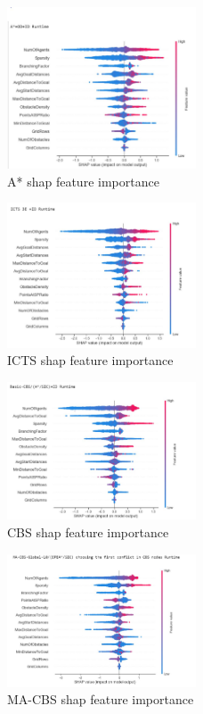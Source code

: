 \documentclass[letterpaper]{article} %
\begin{document}
\begin{figure}[h]
    \centering
    \includegraphics[width=0.5\textwidth]{ASTAR.JPG}
    \caption{A* shap feature importance}
    \label{fig:3}
\end{figure}
\begin{figure}[h]
    \centering
    \includegraphics[width=0.5\textwidth]{ICTS.JPG}
    \caption{ICTS shap feature importance}
    \label{fig:3}
\end{figure}
\begin{figure}[h]
    \centering
    \includegraphics[width=0.5\textwidth]{CBS.JPG}
    \caption{CBS shap feature importance}
    \label{fig:3}
\end{figure}
\begin{figure}[h]
    \centering
    \includegraphics[width=0.5\textwidth]{MA-CBS.JPG}
    \caption{MA-CBS shap feature importance}
    \label{fig:3}
\end{figure}
\end{document}
